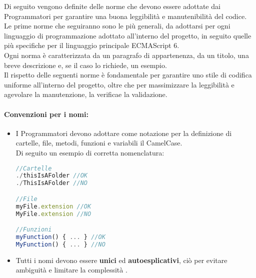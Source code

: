 Di seguito vengono definite delle norme che devono essere adottate dai Programmatori per garantire una buona leggibilità  e manutenibilità  del codice. Le prime norme che seguiranno sono le più generali, da adottarsi per ogni linguaggio di programmazione adottato all'interno del progetto, in seguito quelle più specifiche per il linguaggio principale ECMAScript 6\glossario.\\
Ogni norma è caratterizzata da un paragrafo di appartenenza, da un titolo, una breve descrizione e, se il caso lo richiede, un esempio.\\
Il rispetto delle seguenti norme è fondamentale per garantire uno stile di codifica uniforme all'interno del progetto, oltre che per massimizzare la leggibilità  e agevolare la manutenzione, la verifica\glossario e la validazione\glossario.

\paragraph{Convenzioni per i nomi:} \label{Nomi}
\begin{itemize}	
	\item I Programmatori devono adottare come notazione per la definizione di cartelle, file, metodi, funzioni e variabili il CamelCase\glossario.\\
	Di seguito un esempio di corretta nomenclatura:
	\begin{lstlisting}[language=JavaScript]
//Cartelle 
./thisIsAFolder	//OK
./ThisIsAFolder //NO

//File
myFile.extension //OK
MyFile.extension //NO

//Funzioni
myFunction() { ... } //OK
MyFunction() { ... } //NO
	\end{lstlisting}

	\item Tutti i nomi devono essere \textbf{unici} ed \textbf{autoesplicativi}, ciò per evitare ambiguità  e limitare la complessità .
\end{itemize}
